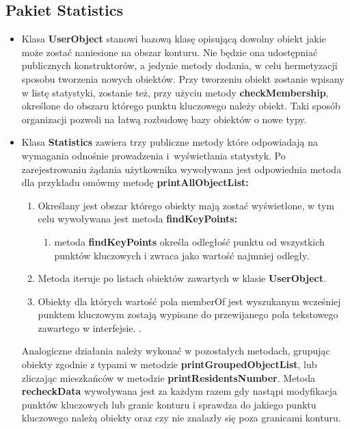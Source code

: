 \documentclass[a4paper,11pt]{article}
\begin{document}
\subsection{Pakiet Statistics}
\begin{itemize}
\item Klasa \textbf{UserObject} stanowi bazową klasę opisującą dowolny obiekt jakie może zostać naniesione na obszar konturu. Nie będzie ona udostępniać publicznych konstruktorów, a jedynie metody dodania, w celu hermetyzacji sposobu tworzenia nowych obiektów. Przy tworzeniu obiekt zostanie wpisany w listę statystyki, zostanie też, przy użyciu metody \textbf{checkMembership}, określone do obszaru którego punktu kluczowego należy obiekt. Taki sposób organizacji pozwoli na łatwą rozbudowę bazy obiektów o nowe typy.
\item Klasa \textbf{Statistics} zawiera trzy publiczne metody które odpowiadają na wymagania odnośnie prowadzenia i~wyświetlania statystyk. Po zarejestrowaniu żądania użytkownika wywoływana jest odpowiednia metoda dla przykładu omówmy metodę \textbf{printAllObjectList:}
\begin{enumerate}
\item Określany jest obszar którego obiekty mają zostać wyświetlone, w tym celu wywoływana jest metoda \textbf{findKeyPoints:}
\begin{enumerate}
\item metoda \textbf{findKeyPoints} określa odległość punktu od wszystkich punktów kluczowych i zwraca jako wartość najmniej odległy.
\end{enumerate}
\item Metoda iteruje po listach obiektów zawartych w klasie \textbf{UserObject}.
\item Obiekty dla których wartość pola memberOf jest wyszukanym wcześniej punktem kluczowym zostają wypisane do przewijanego pola tekstowego zawartego w interfejsie. .
\end{enumerate}
Analogiczne działania należy wykonać w pozostałych metodach, grupując obiekty zgodnie z typami w metodzie \textbf{printGroupedObjectList}, lub zliczając mieszkańców w metodzie \textbf{printResidentsNumber}. Metoda \textbf{recheckData} wywoływana jest za każdym razem gdy nastąpi modyfikacja punktów kluczowych lub granic konturu i sprawdza do jakiego punktu kluczowego należą obiekty oraz czy nie znalazły się poza granicami konturu.
\end{itemize}
\end{document}
